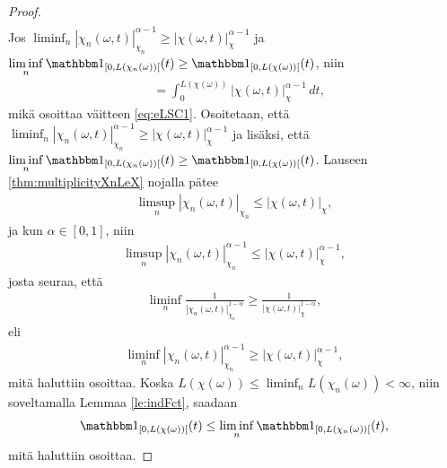 \documentclass[12pt,oneside,a4paper]{amsbook} %
\begin{document}
\begin{proof}
\begin{align*}
    \end{align*}
    Jos $\displaystyle \liminf_n |\chi_n(\omega, t)|_{\chi_n}^{\alpha-1} \ge |\chi(\omega, t)|_{\chi}^{\alpha-1}$ ja $\displaystyle \liminf_n \indfct{[0, L(\chi_n(\omega))[}(t) \ge \indfct{[0, L(\chi(\omega))[}(t)$, niin
    \begin{align*}
        &= \int_0^{L(\chi(\omega))} |\chi(\omega, t)|_{\chi}^{\alpha-1} \, dt,
    \end{align*}
    mikä osoittaa väitteen \eqref{eq:eLSC1}. Osoitetaan, että $\displaystyle \liminf_n |\chi_n(\omega, t)|_{\chi_n}^{\alpha-1} \ge |\chi(\omega, t)|_{\chi}^{\alpha-1}$ ja lisäksi, että $\displaystyle \liminf_n \indfct{[0, L(\chi_n(\omega))[}(t) \ge \indfct{[0, L(\chi(\omega))[}(t)$.
    Lauseen \ref{thm:multiplicityXnLeX} nojalla pätee
    \begin{align*}
        \limsup_n|\chi_n(\omega, t)|_{\chi_n} \le |\chi(\omega, t)|_\chi,
    \end{align*}
    ja kun $\alpha \in [0, 1]$, niin 
    \begin{align*}
        \limsup_n|\chi_n(\omega, t)|_{\chi_n}^{\alpha-1} \le |\chi(\omega, t)|_\chi^{\alpha-1},
    \end{align*}
    josta seuraa, että
    \begin{align*}
        \liminf_n\frac{1}{|\chi_n(\omega, t)|_{\chi_n}^{1-\alpha}} \ge \frac{1}{|\chi(\omega, t)|_{\chi}^{1-\alpha}},
    \end{align*}
    eli
    \begin{align*}
        \liminf_n{|\chi_n(\omega, t)|_{\chi_n}^{\alpha-1}} \ge |\chi(\omega, t)|_{\chi}^{\alpha-1},
    \end{align*}
    mitä haluttiin osoittaa. Koska $L(\chi(\omega)) \le \liminf_n L(\chi_n(\omega)) < \infty$, niin soveltamalla Lemmaa \ref{le:indFct}, saadaan
    \begin{equation*}
        \indfct{[0, L(\chi(\omega))[}(t) \le \liminf_{n} \indfct{[0, L(\chi_n(\omega))[}(t),
    \end{equation*}
    mitä haluttiin osoittaa.
    

\end{proof}
\end{document}
